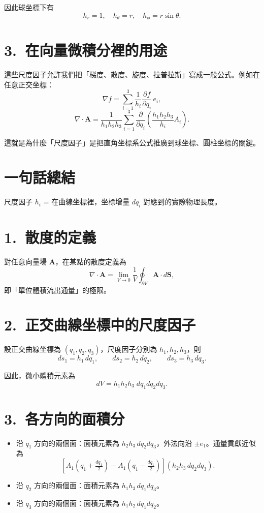 \documentclass{article}
\def\hat#1{#1}%
\begin{document}
因此球坐標下有
\[
h_r=1,\quad h_\theta=r,\quad h_\phi=r\sin\theta.
\]

\section*{3.~在向量微積分裡的用途}
這些尺度因子允許我們把「梯度、散度、旋度、拉普拉斯」寫成一般公式。例如在任意正交坐標：
\[
\nabla f = \sum_{i=1}^3 \frac{1}{h_i}\frac{\partial f}{\partial q_i}\,\hat{e}_i,
\]
\[
\nabla \cdot \mathbf{A}
= \frac{1}{h_1 h_2 h_3}
\sum_{i=1}^3 \frac{\partial}{\partial q_i}
\left(\frac{h_1 h_2 h_3}{h_i} A_i\right).
\]

這就是為什麼「尺度因子」是把直角坐標系公式推廣到球坐標、圓柱坐標的關鍵。

\section*{一句話總結}
尺度因子 $h_i$ = 在曲線坐標裡，坐標增量 $dq_i$ 對應到的實際物理長度。
\section*{1.~散度的定義}
對任意向量場 $\mathbf{A}$，在某點的散度定義為
\[
\nabla \cdot \mathbf{A} = 
\lim_{V\to 0}\frac{1}{V}\oint_{\partial V}\mathbf{A}\cdot d\mathbf{S},
\]
即「單位體積流出通量」的極限。

\section*{2.~正交曲線坐標中的尺度因子}
設正交曲線坐標為 $(q_1,q_2,q_3)$，尺度因子分別為 $h_1,h_2,h_3$，則
\[
ds_1 = h_1\,dq_1,\qquad
ds_2 = h_2\,dq_2,\qquad
ds_3 = h_3\,dq_3.
\]

因此，微小體積元素為
\[
dV = h_1 h_2 h_3 \; dq_1 dq_2 dq_3.
\]

\section*{3.~各方向的面積分}
\begin{itemize}
    \item 沿 $q_1$ 方向的兩個面：面積元素為 $h_2 h_3\,dq_2 dq_3$，外法向沿 $\pm \hat{e}_1$。通量貢獻近似為
    \[
    \left[ A_1\!\left(q_1+\tfrac{dq_1}{2}\right) - A_1\!\left(q_1-\tfrac{dq_1}{2}\right) \right] (h_2 h_3 \, dq_2 dq_3).
    \]

    \item 沿 $q_2$ 方向的兩個面：面積元素為 $h_1 h_3\,dq_1 dq_3$。

    \item 沿 $q_3$ 方向的兩個面：面積元素為 $h_1 h_2\,dq_1 dq_2$。
\end{itemize}
\end{document}
